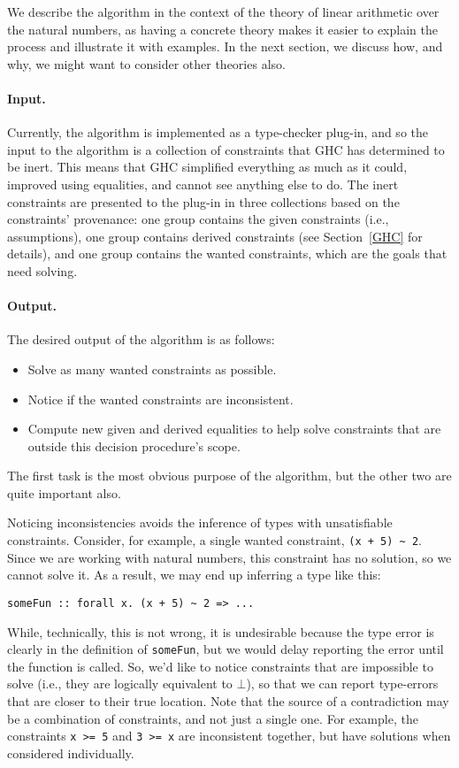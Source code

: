 \documentclass{sigplanconf}
\begin{document}
We describe the algorithm in the context of the theory of linear arithmetic
over the natural numbers, as having a concrete theory makes it easier to explain
the process and illustrate it with examples.  In the next section,
we discuss how, and why, we might want to consider other theories also.

\paragraph{Input.} Currently, the algorithm is implemented as a type-checker
plug-in, and so the input to the algorithm is a collection of constraints
that GHC has determined to be inert. This means that GHC simplified everything
as much as it could, improved using equalities, and cannot see
anything else to do.  The inert constraints are presented to the plug-in
in three collections based on the constraints' provenance: one group contains
the given constraints (i.e., assumptions), one group contains derived
constraints (see Section~\ref{GHC} for details), and one group contains
the wanted constraints, which are the goals that need solving.

\paragraph{Output.} The desired output of the algorithm is as follows:
\begin{itemize}
  \item Solve as many wanted constraints as possible.
  \item Notice if the wanted constraints are inconsistent.
  \item Compute new given and derived equalities to help solve constraints
        that are outside this decision procedure's scope.
\end{itemize}
The first task is the most obvious purpose of the algorithm, but the other
two are quite important also.

Noticing inconsistencies avoids the inference of types with unsatisfiable
constraints.  Consider, for example, a single wanted constraint,
\Verb"(x + 5) ~ 2".  Since we are working with natural numbers,
this constraint has no solution, so we cannot solve it.
As a result, we may end up inferring a type like this:
\begin{Verbatim}
someFun :: forall x. (x + 5) ~ 2 => ...
\end{Verbatim}
While, technically, this is not wrong, it is undesirable because the type
error is clearly in the definition of \Verb"someFun", but we would delay
reporting the error until the function is called.  So, we'd like to
notice constraints that are impossible to solve (i.e., they are logically
equivalent to $\bot$), so that we can report type-errors that are closer
to their true location.  Note that the source of a contradiction may
be a combination of constraints, and not just a single one.  For example,
the constraints \Verb"x >= 5" and \Verb"3 >= x" are inconsistent together,
but have solutions when considered individually.
\end{document}
